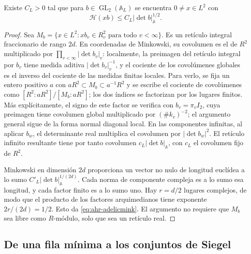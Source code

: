 \begin{lema}
\label{lem:ahr-adelicmink}
Existe $C_L>0$ tal que para $b\in\operatorname{GL}_2(\mathbb A_L)$ se encuentra $0\ne x\in L^2$ con
\begin{equation}
 \mathcal H(xb)\le C_L |\det b|_{\mathbb A}^{1/2}.
 \label{eq:ahr-adelicmink}
\end{equation}
\end{lema}
\begin{proof}
Sea $M_b=\{x\in L^2:xb_v\in R_v^2\text{ para todo }v<\infty\}$. Es un retículo integral fraccionario de rango $2d$. En coordenadas de Minkowski, su covolumen es el de $R^2$ multiplicado por $\prod_{v<\infty}|\det b_v|_v$: localmente, la preimagen del retículo integral por $b_v$ tiene medida aditiva $|\det b_v|_v^{-1}$, y el cociente de los covolúmenes globales es el inverso del cociente de las medidas finitas locales. Para verlo, se fija un entero positivo $a$ con $aR^2\subset M_b\subset a^{-1}R^2$ y se escribe el cociente de covolúmenes como $[R^2:aR^2]/[M_b:aR^2]$; los dos índices se factorizan por los lugares finitos. Más explícitamente, el signo de este factor se verifica con $b_v=\pi_v I_2$, cuya preimagen tiene covolumen global multiplicado por $(\#k_v)^{-2}$; el argumento general sigue de la forma normal diagonal local. En las componentes infinitas, al aplicar $b_w$, el determinante real multiplica el covolumen por $|\det b_w|^2$. El retículo infinito resultante tiene por tanto covolumen $c_L |\det b|_{\mathbb A}$, con $c_L$ el covolumen fijo de $R^2$.

Minkowski en dimensión $2d$ proporciona un vector no nulo de longitud euclídea a lo sumo $C'_L|\det b|_{\mathbb A}^{1/(2d)}$. Cada norma de componente compleja es a lo sumo esa longitud, y cada factor finito es a lo sumo uno. Hay $r=d/2$ lugares complejos, de modo que el producto de los factores arquimedianos tiene exponente $2r/(2d)=1/2$. Esto da \eqref{eq:ahr-adelicmink}. El argumento no requiere que $M_b$ sea libre como $R$-módulo, solo que sea un retículo real.
\end{proof}

\subsection{De una fila mínima a los conjuntos de Siegel}

